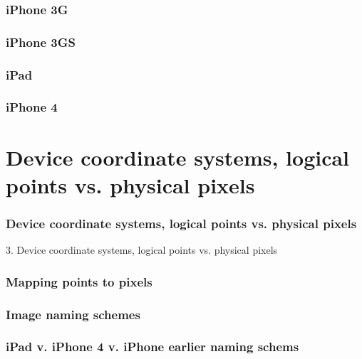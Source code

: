 \documentclass[10pt]{beamer}
\begin{document}
    
\begin{frame}[fragile]
  \frametitle{iPhone 3G}
  
\end{frame}

    
\begin{frame}[fragile]
  \frametitle{iPhone 3GS}
  
\end{frame}

    
\begin{frame}[fragile]
  \frametitle{iPad}
  
\end{frame}

    
\begin{frame}[fragile]
  \frametitle{iPhone 4}
  
\end{frame}

    

   
  

  
    
\section{Device coordinate systems, logical points vs. physical pixels}
\begin{frame}[fragile]
  \frametitle{Device coordinate systems, logical points vs. physical pixels}
  3. Device coordinate systems, logical points vs. physical pixels
\end{frame}


    
\begin{frame}[fragile]
  \frametitle{Mapping points to pixels}
  
\end{frame}

    
\begin{frame}[fragile]
  \frametitle{Image naming schemes}
  
\end{frame}

    
\begin{frame}[fragile]
  \frametitle{iPad v. iPhone 4 v. iPhone earlier naming schems}
  
\end{frame}

    

   
\end{document}
